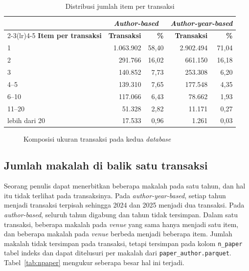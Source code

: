 \begin{table}[ht]
\caption{Distribusi jumlah item per transaksi}
\label{tab:distribusi-tx}
\small
\begin{tabular}{@{}lrrrr@{}}
\toprule
 & \multicolumn{2}{c}{\textbf{\textit{Author-based}}} & \multicolumn{2}{c}{\textbf{\textit{Author-year-based}}} \\
\cmidrule(lr){2-3}\cmidrule(lr){4-5}
\textbf{Item per transaksi} & \textbf{Transaksi} & \textbf{\%} & \textbf{Transaksi} & \textbf{\%} \\
\midrule
1 & 1.063.902 & 58,40 & 2.902.494 & 71,04 \\
2 & 291.766 & 16,02 & 661.150 & 16,18 \\
3 & 140.852 & 7,73 & 253.308 & 6,20 \\
4--5 & 139.310 & 7,65 & 177.548 & 4,35 \\
6--10 & 117.066 & 6,43 & 78.662 & 1,93 \\
11--20 & 51.328 & 2,82 & 11.171 & 0,27 \\
lebih dari 20 & 17.533 & 0,96 & 1.261 & 0,03 \\
\bottomrule
\end{tabular}
\end{table}

\begin{figure}[ht]
\centering
{}
\caption{Komposisi ukuran transaksi pada kedua \textit{database}}
\label{fig:komposisi}
\end{figure}

\subsection{Jumlah makalah di balik satu transaksi}
\label{sec:hasil-npaper}
Seorang penulis dapat menerbitkan beberapa makalah pada satu tahun, dan hal itu tidak terlihat pada transaksinya. Pada \textit{author-year-based}, setiap tahun menjadi transaksi terpisah sehingga 2024 dan 2025 menjadi dua transaksi. Pada \textit{author-based}, seluruh tahun digabung dan tahun tidak tersimpan. Dalam satu transaksi, beberapa makalah pada \textit{venue} yang sama hanya menjadi satu item, dan beberapa makalah pada \textit{venue} berbeda menjadi beberapa item. Jumlah makalah tidak tersimpan pada transaksi, tetapi tersimpan pada kolom \texttt{n\_paper} tabel indeks dan dapat ditelusuri per makalah dari \texttt{paper\_author.parquet}. Tabel~\ref{tab:npaper} mengukur seberapa besar hal ini terjadi.

